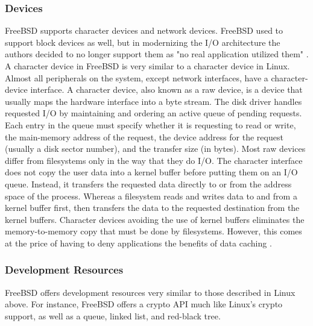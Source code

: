 \documentclass[onecolumn,draftclsnofoot, 10pt, compsoc]{IEEEtran}
\begin{document}
		\subsubsection{Devices}
			FreeBSD supports character devices and network devices.
			FreeBSD used to support block devices as well, but in modernizing the I/O architecture the authors decided to no longer support them as "no real application utilized them" \cite{freeBSDSmall}.
			A character device in FreeBSD is very similar to a character device in Linux.
			Almost all peripherals on the system, except network interfaces, have a character-device interface. 
			A character device, also known as a raw device, is a device that usually maps the hardware interface into a byte stream.
			The disk driver handles requested I/O by maintaining and ordering an active queue of pending requests. 
			Each entry in the queue must specify whether it is requesting to read or write, the main-memory address of the request, the device address for the request (usually a disk sector number), and the transfer size (in bytes).
			Most raw devices differ from filesystems only in the way that they do I/O. 
			The character interface does not copy the user data into a kernel buffer before putting them on an I/O queue. Instead, it transfers the requested data directly to or from the address space of the process.
			Whereas a filesystem reads and writes data to and from a kernel buffer first, then transfers the data to the requested destination from the kernel buffers. 
			Character devices avoiding the use of kernel buffers eliminates the memory-to-memory copy that must be done by filesystems.
			However, this comes at the price of having to deny applications the benefits of data caching \cite{freeBSDDev}.
	
		\subsubsection{Development Resources}
			FreeBSD offers development resources very similar to those described in Linux above.
			For instance, FreeBSD offers a crypto API much like Linux's crypto support, as well as a queue, linked list, and red-black tree.
	
\end{document}
